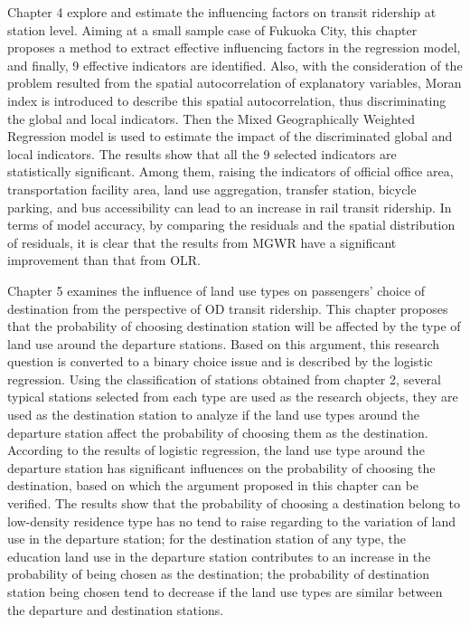 \documentclass[12pt, twoside, a4paper]{book} %
\begin{document}
Chapter 4 explore and estimate the influencing factors on transit ridership at station level. Aiming at a small sample case of Fukuoka City, this chapter proposes a method to extract effective influencing factors in the regression model, and finally, 9 effective indicators are identified. Also, with the consideration of the problem resulted from the spatial autocorrelation of explanatory variables, Moran index is introduced to describe this spatial autocorrelation, thus discriminating the global and local indicators. Then the Mixed Geographically Weighted Regression model is used to estimate the impact of the discriminated global and local indicators. The results show that all the 9 selected indicators are statistically significant. Among them, raising the indicators of official office area, transportation facility area, land use aggregation, transfer station, bicycle parking, and bus accessibility can lead to an increase in rail transit ridership. In terms of model accuracy, by comparing the residuals and the spatial distribution of residuals, it is clear that the results from MGWR have a significant improvement than that from OLR.

Chapter 5 examines the influence of land use types on passengers' choice of destination from the perspective of OD transit ridership. This chapter proposes that the probability of choosing destination station will be affected by the type of land use around the departure stations. Based on this argument, this research question is converted to a binary choice issue and is described by the logistic regression. Using the classification of stations obtained from chapter 2, several typical stations selected from each type are used as the research objects, they are used as the destination station to analyze if the land use types around the departure station affect the probability of choosing them as the destination. According to the results of logistic regression, the land use type around the departure station has significant influences on the probability of choosing the destination, based on which the argument proposed in this chapter can be verified. The results show that the probability of choosing a destination belong to low-density residence type has no tend to raise regarding to the variation of land use in the departure station; for the destination station of any type, the education land use in the departure station contributes to an increase in the probability of being chosen as the destination; the probability of destination station being chosen tend to decrease if the land use types are similar between the departure and destination stations.
\end{document}
